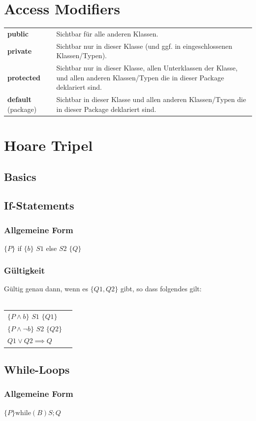 \documentclass[12pt,a4paper]{article}
\begin{document}
\section{Access Modifiers}
\begin{tabularx}{\linewidth}{ l X }
\textbf{public} & Sichtbar für alle anderen Klassen.\\
\textbf{private} & Sichtbar nur in dieser Klasse (und ggf. in eingeschlossenen Klassen/Typen).\\
\textbf{protected} & Sichtbar nur in dieser Klasse, allen Unterklassen der Klasse, und allen anderen Klassen/Typen die in dieser Package deklariert sind.\\
\textbf{default} (package) & Sichtbar in dieser Klasse und allen anderen Klassen/Typen die in dieser Package deklariert sind.
\end{tabularx}
\section{Hoare Tripel}
\subsection{Basics} %
\subsection{If-Statements}
\subsubsection{Allgemeine Form}
$\{P\}$ if $\{b\}$ $S1$ else $S2$ $\{Q\}$
\subsubsection{Gültigkeit}
Gültig genau dann, wenn es $\{Q1, Q2\}$ gibt, so dass folgendes gilt:\\\\
\begin{tabular}{ll}
$\{P \land b\}$ $S1$ $\{Q1\}$\\
$\{P \land \neg b \}$ $S2$ $\{Q2\}$\\
$Q1 \lor Q2 \implies Q$
\end{tabular}

\subsection{While-Loops}
\subsubsection{Allgemeine Form}
$\{P\} \text{while}(B) S; {Q}$
\end{document}
